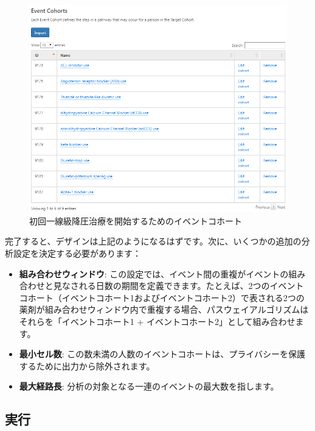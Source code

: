 \documentclass[
  11pt]{book}
\providecommand{\tightlist}{%
  \setlength{\itemsep}{0pt}\setlength{\parskip}{0pt}}
\theoremstyle{definition}
\theoremstyle{definition}
\theoremstyle{definition}
\theoremstyle{definition}
\theoremstyle{remark}
\begin{document}
\begin{figure}

{\centering \includegraphics[width=1\linewidth]{images/Characterization/atlasPathwaysEventCohorts} 

}

\caption{初回一線級降圧治療を開始するためのイベントコホート}\label{fig:atlasPathwaysEventCohorts}
\end{figure}

完了すると、デザインは上記のようになるはずです。次に、いくつかの追加の分析設定を決定する必要があります：

\begin{itemize}
\tightlist
\item
  \textbf{組み合わせウィンドウ}: この設定では、イベント間の重複がイベントの組み合わせと見なされる日数の期間を定義できます。たとえば、2つのイベントコホート（イベントコホート1およびイベントコホート2）で表される2つの薬剤が組み合わせウィンドウ内で重複する場合、パスウェイアルゴリズムはそれらを「イベントコホート1 + イベントコホート2」として組み合わせます。
\item
  \textbf{最小セル数}: この数未満の人数のイベントコホートは、プライバシーを保護するために出力から除外されます。
\item
  \textbf{最大経路長}: 分析の対象となる一連のイベントの最大数を指します。
\end{itemize}

\subsection{実行}\label{ux5b9fux884c-1}
\end{document}
